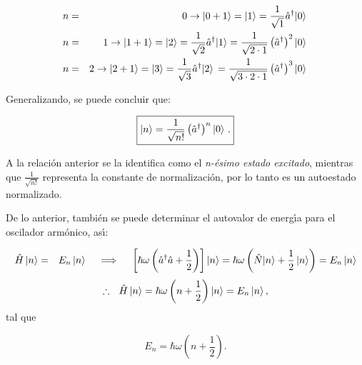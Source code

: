 \begin{eqnarray*}
n &=&0\rightarrow |0+1\rangle =|1\rangle =\frac{1}{\sqrt{1}}\hat{a}^{\dagger
}|0\rangle \, \\
n &=&1\rightarrow |1+1\rangle =|2\rangle =\frac{1}{\sqrt{2}}\hat{a}^{\dagger
}|1\rangle =\frac{1}{\sqrt{2\cdot 1}}\left( \hat{a}^{\dagger }\right)
^{2}|0\rangle \, \\
n &=&2\rightarrow |2+1\rangle =|3\rangle =\frac{1}{\sqrt{3}}\hat{a}^{\dagger
}|2\rangle \,=\frac{1}{\sqrt{3\cdot 2\cdot 1}}\left( \hat{a}^{\dagger }\right)
^{3}|0\rangle \, \\
\end{eqnarray*}

Generalizando, se puede concluir que:

\begin{equation}
\boxed{
|n\rangle =\frac{1}{\sqrt{n!}}\left( \hat{a}^{\dagger }\right) ^{n}|0\rangle \
\label{1.21}.
}
\end{equation}

A la relaci\'{o}n anterior se la identifica como el \emph{n-\'{e}simo estado excitado}, mientras que $\frac{1}{\sqrt{n!}}$ representa la constante de
normalizaci\'{o}n, por lo tanto es un autoestado normalizado.

De lo anterior, tambi\'{e}n se puede determinar el autovalor de energ\'{\i}a para el oscilador armónico, as\'{\i}:

\begin{eqnarray*}
\OoH \left\vert n\right\rangle  &=&E_{n}\left\vert n\right\rangle ~\ \ \implies
~\ ~\left[ \hbar \omega \left( \Oaa^{\dagger } \Oaa+\frac{1}{2}\right) \right]
\left\vert n\right\rangle =\hbar \omega \left( \OoN|n\rangle +\frac{1}{2}%
\left\vert n\right\rangle \right) =E_{n}\left\vert n\right\rangle 
\end{eqnarray*}
\begin{equation}
    \therefore ~~ \OoH \left\vert n\right\rangle =\hbar \omega \left( n+\frac{1}{2}%
\right) \left\vert n\right\rangle =E_{n}\left\vert n\right\rangle, 
\end{equation}
 tal que

\begin{equation}
E_{n}=\hbar \omega \left( n+\frac{1}{2}\right)   \label{1.22}.
\end{equation}

